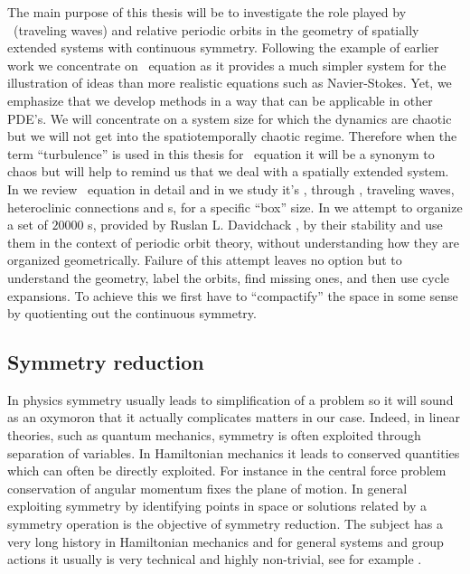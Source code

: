 The main purpose of this thesis will be to investigate the role played by \reqva\ (traveling waves)
and relative periodic orbits in the geometry of spatially extended systems with continuous symmetry. Following
the example of earlier work we concentrate on \KS\ equation as it provides a much simpler system for the illustration
of ideas than more realistic equations such as Navier-Stokes. Yet, we emphasize that we develop methods in
a way that can be applicable in other PDE's. We will
concentrate on a system size for which the dynamics are chaotic
but we will not get into the spatiotemporally chaotic regime.
Therefore when the term ``turbulence'' is
used in this thesis for \KS\ equation it will be a synonym to chaos but will help
to remind us that we deal with a spatially extended system. In  we review \KS\ equation in detail
and in  we study it's \statesp, through \eqva, traveling waves, heteroclinic connections
and \rpo s, for a specific ``box'' size. In  we attempt to
organize a set of $20000$ \rpo s, provided by Ruslan L.
Davidchack , by their stability and use
them in the context of periodic orbit theory, without
understanding how they are organized geometrically. Failure of
this attempt leaves no option but to understand the geometry,
label the orbits, find missing ones, and then use cycle
expansions. To achieve this we first have to ``compactify'' the
space in some sense by quotienting out the continuous symmetry.

\subsection{Symmetry reduction}

In physics symmetry usually leads to simplification of a problem so it will sound as an oxymoron that it actually
complicates matters in our case. Indeed, in linear theories, such as quantum mechanics, symmetry is often exploited
through separation of variables. In Hamiltonian mechanics it leads to conserved quantities which can often be
directly exploited. For instance in the central force problem conservation of angular momentum fixes the plane
of motion. %
In general exploiting symmetry by identifying points in space or solutions
related by a symmetry operation is the objective of
symmetry reduction. The subject has a very long history in Hamiltonian mechanics and for general systems
and group actions it usually is very technical and highly non-trivial, see for example
.

